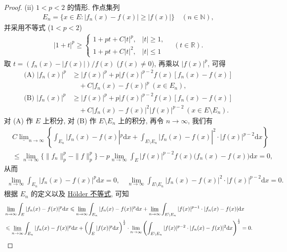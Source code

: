 \documentclass[../../main.tex]{subfiles}%
\begin{document}
\begin{proof}
(ii) $1<p<2$ 的情形. 作点集列
\begin{align*}
E_n=\{x\in E:|f_n(x)-f(x)|\geqslant|f(x)|\}\quad (n\in\mathbb{N}),
\end{align*}
并采用不等式 ($1<p<2$)
\begin{align}
|1+t|^p\geqslant
\begin{cases}
1+pt+C|t|^p, & |t|\geqslant 1, \\
1+pt+C|t|^2, & |t|\leqslant 1
\end{cases}
\quad (t\in\mathbb{R}). \label{eq:radon2}
\end{align}
取 $t=(f_n(x)-|f(x)|)/f(x)$ ($f(x)\neq 0$), 再乘以 $|f(x)|^p$, 可得
\begin{align*}
\text{(A) } |f_n(x)|^p &\geqslant |f(x)|^p + p|f(x)|^{p-2}f(x)[f_n(x)-f(x)] \\
&\quad + C|f_n(x)-f(x)|^p\ (x\in E_n), \\
\text{(B) } |f_n(x)|^p &\geqslant |f(x)|^p + p|f(x)|^{p-2}f(x)[f_n(x)-f(x)] \\
&\quad + C|f_n(x)-f(x)|^2|f(x)|^{p-2}\ (x\in E\setminus E_n).
\end{align*}
对 (A) 作 $E$ 上积分, 对 (B) 作 $E\setminus E_n$ 上的积分, 再令 $n\to\infty$, 我们有
\begin{align*}
&C\underline{\lim }_{n\rightarrow \infty}\left\{ \int_{E_n}{|f_n(x)}-f(x)|^p\mathrm{d}x+\int_{E\setminus E_n}{|f_n(x)}-f(x)|^2\cdot |f(x)|^{p-2}\mathrm{d}x \right\} 
\\
&\leqslant \lim_{n\rightarrow \infty} \{\parallel f_n\parallel _{p}^{p}-\parallel f\parallel _{p}^{p}\}-p\lim_{n\rightarrow \infty} \int_E{|f(x)|^{p-2}f(x)(f_n(x)}-f(x))\mathrm{d}x=0,
\end{align*}
从而
\begin{align*}
\lim_{n\to\infty}\int_{E_n}|f_n(x)-f(x)|^p\mathrm{d}x=0, \quad
\lim_{n\to\infty}\int_{E\setminus E_n}|f_n(x)-f(x)|^2\cdot|f(x)|^{p-2}\mathrm{d}x=0.
\end{align*}
根据 $E_n$ 的定义以及 \hyperref[theorem:实变函数--Hölder不等式]{Hölder 不等式}, 可知
\begin{align*}
&\varliminf_{n\to\infty}\int_E |f_n(x)-f(x)|^p\mathrm{d}x
\leqslant \varliminf_{n\to\infty}\int_{E_n}|f_n(x)-f(x)|^p\mathrm{d}x + \varliminf_{n\to\infty}\int_{E\setminus E_n}|f(x)|^{p-1}\cdot|f_n(x)-f(x)|\mathrm{d}x \\
&\leqslant \varliminf_{n\to\infty}\int_{E_n}|f_n(x)-f(x)|^p\mathrm{d}x + \left(\int_E |f(x)|^p\mathrm{d}x\right)^{\frac{1}{2}}\cdot\lim_{n\to\infty}\left(\int_{E\setminus E_n}|f(x)|^{p-2}\cdot|f_n(x)-f(x)|^2\mathrm{d}x\right)^{\frac{1}{2}}=0.
\end{align*}

\end{proof}
\end{document}
